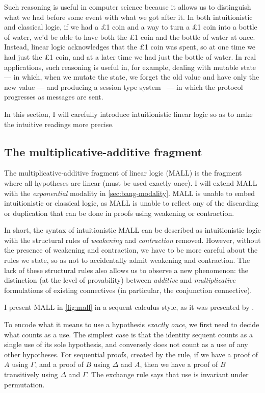 Such reasoning is useful in computer science because it allows us to distinguish
what we had before some event with what we got after it.
In both intuitionistic and classical logic, if we had a \pounds{}1 coin and a
way to turn a \pounds{}1 coin into a bottle of water, we'd be able to have both
the \pounds{}1 coin and the bottle of water at once.
Instead, linear logic acknowledges that the \pounds{}1 coin was spent, so at one
time we had just the \pounds{}1 coin, and at a later time we had just the bottle
of water.
In real applications, such reasoning is useful in, for example, dealing with
mutable state~\citep{MK19} --- in which, when we mutate the state, we forget the
old value and have only the new value --- and producing a session type system~%
\citep{Wadler12} --- in which the protocol progresses as messages are sent.

In this section, I will carefully introduce intuitionistic linear logic so as to
make the intuitive readings more precise.

\subsection{The multiplicative-additive fragment}

The multiplicative-additive fragment of linear logic (MALL) is the fragment
where all hypotheses are linear (must be used exactly once).
I will extend MALL with the \emph{exponential} modality in
\cref{sec:bang-modality}.
MALL is unable to embed intuitionistic or classical logic, as MALL is unable to
reflect any of the discarding or duplication that can be done in proofs using
weakening or contraction.

In short, the syntax of intuitionistic MALL can be described as intuitionistic
logic with the structural rules of \emph{weakening} and \emph{contraction}
removed.
However, without the presence of weakening and contraction, we have to be more
careful about the rules we state, so as not to accidentally admit weakening
and contraction.
The lack of these structural rules also allows us to observe a new phenomenon:
the distinction (at the level of provability) between \emph{additive} and
\emph{multiplicative} formulations of existing connectives (in particular, the
conjunction connective).

I present MALL in \cref{fig:mall} in a sequent calculus style, as it was
presented by \citet{girard87linear}.

To encode what it means to use a hypothesis \emph{exactly once}, we first need
to decide what counts as a use.
The simplest case is that the identity sequent counts as a single use of its
sole hypothesis, and conversely does not count as a use of any other hypotheses.
For sequential proofs, created by the  rule, if we have a proof of
$A$ using $\Gamma$, and a proof of $B$ using $\Delta$ and $A$, then we have a
proof of $B$ transitively using $\Delta$ and $\Gamma$.
The exchange rule  says that use is invariant under permutation.

